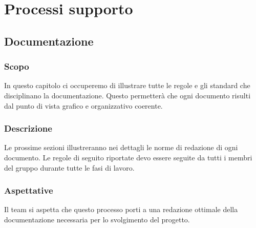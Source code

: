 \section{Processi supporto}
\subsection{Documentazione}

\subsubsection{Scopo}
In questo capitolo ci occuperemo di illustrare tutte le regole e gli standard che disciplinano la documentazione. Questo permetterà che ogni documento risulti dal punto di vista grafico e organizzativo coerente.
\subsubsection{Descrizione}
Le prossime sezioni illustreranno nei dettagli le norme di redazione di ogni documento.
Le regole di seguito riportate devo essere seguite da tutti i membri del gruppo durante tutte le fasi di lavoro.

\subsubsection{Aspettative}
Il team si aspetta che questo processo porti a una redazione ottimale della documentazione necessaria per lo svolgimento del progetto.


